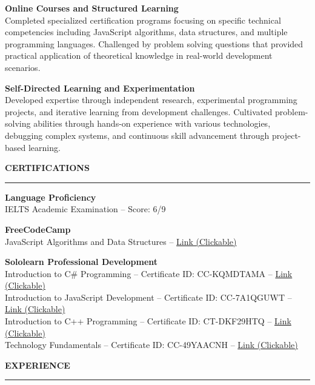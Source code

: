 \documentclass[a4paper,10pt]{article}
\newcommand{\sectionheading}[1]{%
  \addvspace{\medskipamount}%
  {\large\bfseries\MakeUppercase{#1}} %
  \noindent\rule{\linewidth}{0.4pt}%
  \vspace{\smallskipamount}%
}
\begin{document}
\addvspace{\smallskipamount}

\textbf{Online Courses and Structured Learning}\\
Completed specialized certification programs focusing on specific technical competencies including JavaScript algorithms, data structures, and multiple programming languages. Challenged by problem solving questions that provided practical application of theoretical knowledge in real-world development scenarios.

\addvspace{\smallskipamount}

\textbf{Self-Directed Learning and Experimentation}\\
Developed expertise through independent research, experimental programming projects, and iterative learning from development challenges. Cultivated problem-solving abilities through hands-on experience with various technologies, debugging complex systems, and continuous skill advancement through project-based learning.

\sectionheading{Certifications}

\textbf{Language Proficiency}\\
IELTS Academic Examination -- Score: 6/9

\addvspace{\smallskipamount}

\textbf{FreeCodeCamp}\\
JavaScript Algorithms and Data Structures -- \href{https://freecodecamp.org/certification/Assayyaad/javascript-algorithms-and-data-structures}{Link (Clickable)}

\addvspace{\smallskipamount}

\textbf{Sololearn Professional Development}\\
Introduction to C\# Programming -- Certificate ID: CC-KQMDTAMA -- \href{https://www.sololearn.com/en/certificates/CC-KQMDTAMA}{Link (Clickable)}\\
Introduction to JavaScript Development -- Certificate ID: CC-7A1QGUWT -- \href{https://www.sololearn.com/en/certificates/CC-7A1QGUWT}{Link (Clickable)}\\
Introduction to C++ Programming -- Certificate ID: CT-DKF29HTQ -- \href{https://www.sololearn.com/en/certificates/CT-DKF29HTQ}{Link (Clickable)}\\
Technology Fundamentals -- Certificate ID: CC-49YAACNH -- \href{https://www.sololearn.com/en/certificates/CC-49YAACNH}{Link (Clickable)}

\sectionheading{Experience}
\end{document}
